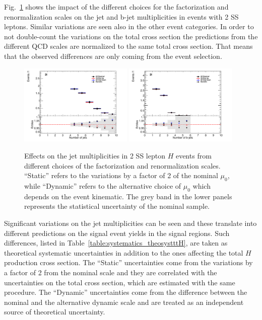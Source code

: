 Fig.~\ref{figure:systematics_theosyst} shows the impact of the different choices for the factorization and renormalization scales on the jet and b-jet multiplicities in events with 2 SS leptons. Similar variations are seen also in the other event categories. In order to not double-count the variations on the total cross section the predictions from the different QCD scales are normalized to the same total cross section. That means that the observed differences are only coming from the event selection.
\begin{figure}[htbp]
\begin{center}
\includegraphics[width=0.48\textwidth]{figs/tth/plot_2l_NJet_ttH_nom}
\includegraphics[width=0.48\textwidth]{figs/tth/plot_2l_NJetBTag_ttH_nom}
\caption{Effects on the jet multiplicities in 2 SS lepton \ttbar$H$ events from different choices of the factorization and renormalization scales. ``Static'' refers to the variations by a factor of 2 of the nominal $\mu_{0}$, while ``Dynamic'' refers to the alternative choice of $\mu_{0}$ which depends on the event kinematic. The grey band in the lower panels represents the statistical uncertainty of the nominal sample.}
\label{figure:systematics_theosyst}
\end{center}
\end{figure}
Significant variations on the jet multiplicities can be seen and these translate into different predictions on the signal event yields in the signal regions. Such differences, listed in Table~\ref{table:systematics_theosystttH}, are taken as theoretical systematic uncertainties in addition to the ones affecting the total \ttbar$H$ production cross section. The ``Static'' uncertainties come from the variations by a factor of 2 from the nominal scale and they are correlated with the uncertainties on the total cross section, which are estimated with the same procedure. The ``Dynamic''  uncertainties come from the difference between the nominal and the alternative dynamic scale and are treated as an independent source of theoretical uncertainty. 

